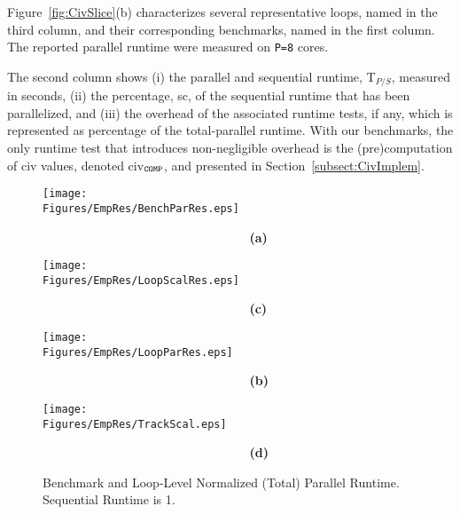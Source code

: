 \documentclass[10pt,nocopyrightspace]{sigplanconf}
\newcommand{\Figures}[1]{../Figures/}
\begin{document}
%
Figure~\ref{fig:CivSlice}(b) characterizes several representative loops, named in 
the third column, and their corresponding benchmarks, named in the first column.
The reported parallel runtime were measured on {\tt P=8} cores.


The second column shows 
(i)   the parallel and sequential runtime, T$_{P/S}$, measured in seconds,
(ii)  the percentage, {\sc sc}, of the sequential runtime that has been parallelized, and 
(iii) the overhead of the associated runtime tests, if any, which is represented as percentage of
        the total-parallel runtime. With our benchmarks, the only runtime test that introduces
        non-negligible overhead is the (pre)computation of {\sc civ} values, 
        denoted {\sc civ}$_{\tt{}COMP}$, and presented in Section~\ref{subsect:CivImplem}.   


\begin{figure*}[t] 
\begin{minipage}{1.2\columnwidth}
    \texttt{[image: \\Figures/EmpRes/BenchParRes.eps]} 

      {\bf~~~~~~~~~~~~~~~~~~~~~~~~~~~~~(a)} \vspace{2ex}

    \texttt{[image: \\Figures/EmpRes/LoopScalRes.eps]}
      
      {\bf~~~~~~~~~~~~~~~~~~~~~~~~~~~~~(c)}\vspace{1ex}

\end{minipage}
\begin{minipage}{0.9\columnwidth}
    \texttt{[image: \\Figures/EmpRes/LoopParRes.eps]} 

      {\bf~~~~~~~~~~~~~~~~~~~~~~~~~~~~~(b)}\vspace{2ex}

   \texttt{[image: \\Figures/EmpRes/TrackScal.eps]}
      
      {\bf~~~~~~~~~~~~~~~~~~~~~~~~~~~~~(d)}\vspace{1ex}

\end{minipage}
\caption{ Benchmark and Loop-Level Normalized (Total) Parallel Runtime. Sequential Runtime is 1.}
\label{fig:ParRuntime} %
\end{figure*}
\end{document}
